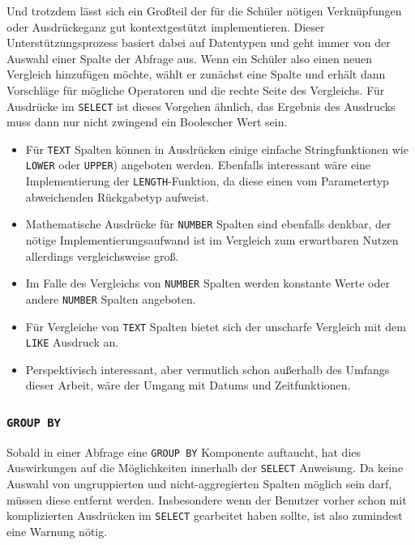 Und trotzdem lässt sich ein Großteil der für die Schüler nötigen Verknüpfungen oder Ausdrückeganz gut kontextgestützt implementieren. Dieser Unterstützungsprozess basiert dabei auf Datentypen und geht immer von der Auswahl einer Spalte der Abfrage aus. Wenn ein Schüler also einen neuen Vergleich hinzufügen möchte, wählt er zunächst eine Spalte und erhält dann Vorschläge für mögliche Operatoren und die rechte Seite des Vergleichs. Für Ausdrücke im \texttt{SELECT} ist dieses Vorgehen ähnlich, das Ergebnis des Ausdrucks muss dann nur nicht zwingend ein Boolescher Wert sein.

\begin{itemize}
\item Für \texttt{TEXT} Spalten können in Ausdrücken einige einfache Stringfunktionen wie \texttt{LOWER} oder \texttt{UPPER}) angeboten werden. Ebenfalls interessant wäre eine Implementierung der \texttt{LENGTH}-Funktion, da diese einen vom Parametertyp abweichenden Rückgabetyp aufweist.
\item Mathematische Ausdrücke für \texttt{NUMBER} Spalten sind ebenfalls denkbar, der nötige Implementierungsaufwand ist im Vergleich zum erwartbaren Nutzen allerdings vergleichsweise groß.
\item Im Falle des Vergleichs von \texttt{NUMBER} Spalten werden konstante Werte oder andere \texttt{NUMBER} Spalten angeboten.
\item Für Vergleiche von \texttt{TEXT} Spalten bietet sich der unscharfe Vergleich mit dem \texttt{LIKE} Ausdruck an.
\item Perspektivisch interessant, aber vermutlich schon außerhalb des Umfangs dieser Arbeit, wäre der Umgang mit Datums und Zeitfunktionen.
\end{itemize}


\subsubsection{\texttt{GROUP BY}}

Sobald in einer Abfrage eine \texttt{GROUP BY} Komponente auftaucht, hat dies Auswirkungen auf die Möglichkeiten innerhalb der \texttt{SELECT} Anweisung. Da keine Auswahl von ungruppierten und nicht-aggregierten Spalten möglich sein darf, müssen diese entfernt werden. Insbesondere wenn der Benutzer vorher schon mit komplizierten Ausdrücken im \texttt{SELECT} gearbeitet haben sollte, ist also zumindest eine Warnung nötig.

